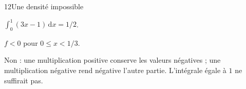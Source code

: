 \begin{corrige}{12}{Une densité impossible}
\begin{questions}
\item $\int_0^1(3x-1)\,\mathrm dx=1/2$.
\item $f<0$ pour $0\leq x<1/3$.
\item Non : une multiplication positive conserve les valeurs négatives ; une multiplication négative rend négative l’autre partie. L’intégrale égale à $1$ ne suffirait pas.
\end{questions}
\end{corrige}
